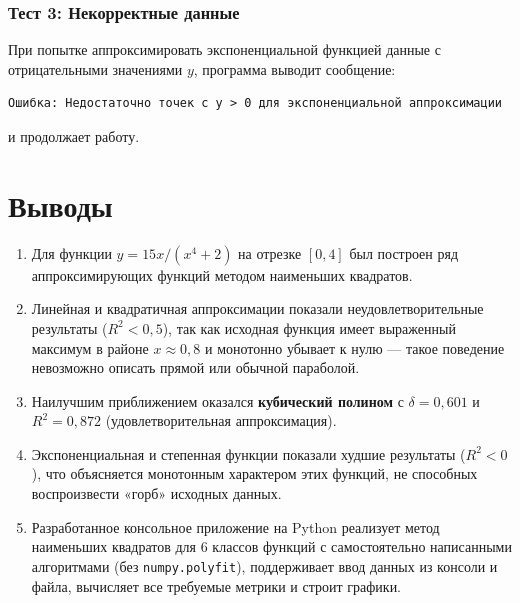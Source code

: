 \documentclass[a4paper,12pt]{article}
\begin{document}
\subsubsection{Тест 3: Некорректные данные}

При попытке аппроксимировать экспоненциальной функцией данные с отрицательными значениями $y$, программа выводит сообщение:
\begin{verbatim}
Ошибка: Недостаточно точек с y > 0 для экспоненциальной аппроксимации
\end{verbatim}
и продолжает работу.

\section{Выводы}

\begin{enumerate}
    \item Для функции $y = 15x/(x^4+2)$ на отрезке $[0, 4]$ был построен ряд аппроксимирующих функций методом наименьших квадратов.

    \item Линейная и квадратичная аппроксимации показали неудовлетворительные результаты ($R^2 < 0{,}5$), так как исходная функция имеет выраженный максимум в районе $x \approx 0{,}8$ и монотонно убывает к нулю — такое поведение невозможно описать прямой или обычной параболой.

    \item Наилучшим приближением оказался \textbf{кубический полином} с $\delta = 0{,}601$ и $R^2 = 0{,}872$ (удовлетворительная аппроксимация).

    \item Экспоненциальная и степенная функции показали худшие результаты ($R^2 < 0$), что объясняется монотонным характером этих функций, не способных воспроизвести «горб» исходных данных.

    \item Разработанное консольное приложение на Python реализует метод наименьших квадратов для 6 классов функций с самостоятельно написанными алгоритмами (без \texttt{numpy.polyfit}), поддерживает ввод данных из консоли и файла, вычисляет все требуемые метрики и строит графики.
\end{enumerate}
\end{document}
